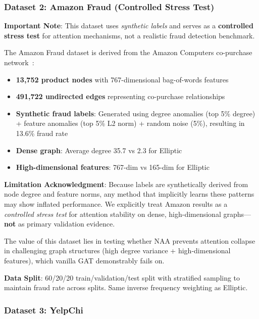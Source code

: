 \subsubsection{Dataset 2: Amazon Fraud (Controlled Stress Test)}

\textbf{Important Note}: This dataset uses \textit{synthetic labels} and serves as a \textbf{controlled stress test} for attention mechanisms, not a realistic fraud detection benchmark.

The Amazon Fraud dataset is derived from the Amazon Computers co-purchase network~\cite{mcauley2015image}:
\begin{itemize}
\item \textbf{13,752 product nodes} with 767-dimensional bag-of-words features
\item \textbf{491,722 undirected edges} representing co-purchase relationships
\item \textbf{Synthetic fraud labels}: Generated using degree anomalies (top 5\% degree) + feature anomalies (top 5\% L2 norm) + random noise (5\%), resulting in 13.6\% fraud rate
\item \textbf{Dense graph}: Average degree 35.7 vs 2.3 for Elliptic
\item \textbf{High-dimensional features}: 767-dim vs 165-dim for Elliptic
\end{itemize}

\textbf{Limitation Acknowledgment}: Because labels are synthetically derived from node degree and feature norms, any method that implicitly learns these patterns may show inflated performance. We explicitly treat Amazon results as a \textit{controlled stress test} for attention stability on dense, high-dimensional graphs---\textbf{not} as primary validation evidence.

The value of this dataset lies in testing whether NAA prevents attention collapse in challenging graph structures (high degree variance + high-dimensional features), which vanilla GAT demonstrably fails on.

\textbf{Data Split}: 60/20/20 train/validation/test split with stratified sampling to maintain fraud rate across splits. Same inverse frequency weighting as Elliptic.

\subsubsection{Dataset 3: YelpChi}

